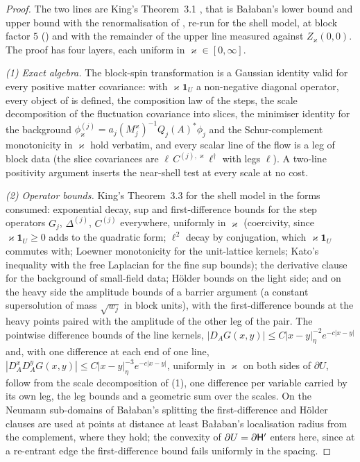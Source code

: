 \begin{proof}
The two lines are King's Theorem~3.1 \cite[(3.3)--(3.4)]{K1}, that is Ba{\l}aban's lower bound \cite[\S\S3--4]{Ba1} and upper bound \cite[\S\S2--3]{Ba2} with the renormalisation of \cite{Ba3}, re-run for the shell model, at block factor $5$ () and with the remainder of the upper line measured against $Z_\varkappa(0,0)$. The proof has four layers, each uniform in $\varkappa\in[0,\infty]$.

\emph{(1) Exact algebra.} The block-spin transformation is a Gaussian identity valid for every positive matter covariance: with $\varkappa\mathbf 1_U$ a non-negative diagonal operator, every object of \cite[(2.13)--(2.17), (3.14)]{K1} is defined, the composition law of the steps, the scale decomposition of the fluctuation covariance into slices, the minimiser identity for the background $\phi^{(j)}_\varkappa=a_j(M^\varkappa_j)^{-1}Q_j(A)^*\phi_j$ and the Schur-complement monotonicity in $\varkappa$ hold verbatim, and every scalar line of the flow is a leg of block data (the slice covariances are $\ell\,C^{(j),\varkappa}\ell^\dagger$ with legs $\ell$). A two-line positivity argument inserts the near-shell test at every scale at no cost.

\emph{(2) Operator bounds.} King's Theorem~3.3 \cite[(3.5)--(3.8)]{K1} for the shell model in the forms consumed: exponential decay, sup and first-difference bounds for the step operators $G_j$, $\Delta^{(j)}$, $C^{(j)}$ everywhere, uniformly in $\varkappa$ (coercivity, since $\varkappa\mathbf 1_U\ge0$ adds to the quadratic form; $\ell^2$ decay by conjugation, which $\varkappa\mathbf 1_U$ commutes with; Loewner monotonicity for the unit-lattice kernels; Kato's inequality with the free Laplacian for the fine sup bounds); the derivative clause for the background of small-field data; H\"older bounds on the light side; and on the heavy side the amplitude bounds of a barrier argument (a constant supersolution of mass $\sqrt{w_j}$ in block units), with the first-difference bounds at the heavy points paired with the amplitude of the other leg of the pair. The pointwise difference bounds of the line kernels, $|D_AG(x,y)|\le C|x-y|_\eta^{-2}e^{-c|x-y|}$ and, with one difference at each end of one line, $|D^x_AD^y_AG(x,y)|\le C|x-y|_\eta^{-3}e^{-c|x-y|}$, uniformly in $\varkappa$ on both sides of $\partial U$, follow from the scale decomposition of (1), one difference per variable carried by its own leg, the leg bounds and a geometric sum over the scales. On the Neumann sub-domains of Ba{\l}aban's splitting the first-difference and H\"older clauses are used at points at distance at least Ba{\l}aban's localisation radius from the complement, where they hold; the convexity of $\partial U=\partial\mathsf H'$ enters here, since at a re-entrant edge the first-difference bound fails uniformly in the spacing.


\end{proof}
